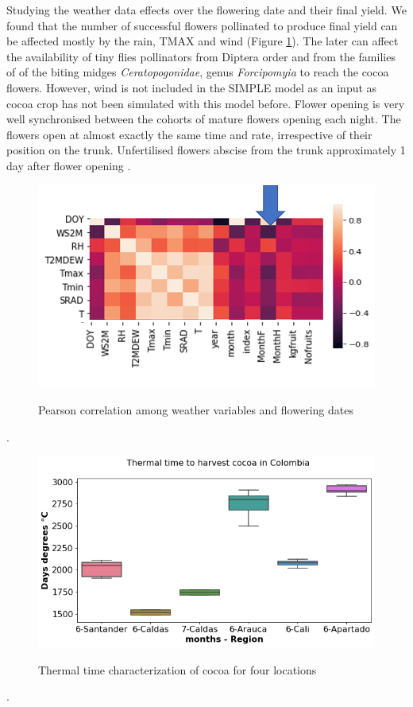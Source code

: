 \documentclass[gene,journal,article,submit,moreauthors,pdftex]{Definitions/mdpi}
\begin{document}
Studying the weather data effects over the flowering date and their final yield. We found that the number of successful flowers pollinated to produce final yield can be affected mostly by the rain, TMAX and wind (Figure \ref{fig:correlation}). The later can affect the availability of tiny flies pollinators from Diptera order and from the families of of the biting midges \textit{Ceratopogonidae},  genus  \textit{Forcipomyia} \citep{Saunders1959, kaufmann1975, sotomayor2020} to reach the cocoa flowers. However, wind is not included in the SIMPLE model as an input as cocoa crop has not been simulated with this model before. Flower opening is very well synchronised between the cohorts of mature flowers opening each night. The flowers open at almost exactly the same time and rate, irrespective of their position on the trunk. Unfertilised flowers abscise from the trunk approximately 1 day after flower opening  \citep{Niemenak2010}. 
\begin{figure}[h!]
	\centering
	\caption{\footnotesize {Pearson correlation among weather variables and flowering dates \\}} 
	\includegraphics[scale=0.7]{images/correlation.png}\\
	\label{fig:correlation}
\end{figure}.

\begin{figure}[h]
	\centering
	\caption{\footnotesize {Thermal time characterization of cocoa for four locations\\}} 
	\includegraphics[scale=0.5]{images/ttbbox.png}
	\label{fig:ttbox}
\end{figure}.
\newpage
\end{document}

